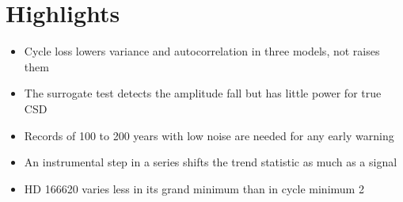 \documentclass{article}
\begin{document}
\section*{Highlights}
\begin{itemize}
\item Cycle loss lowers variance and autocorrelation in three models, not raises them
\item The surrogate test detects the amplitude fall but has little power for true CSD
\item Records of 100 to 200 years with low noise are needed for any early warning
\item An instrumental step in a series shifts the trend statistic as much as a signal
\item HD 166620 varies less in its grand minimum than in cycle minimum 2
\end{itemize}
\end{document}
